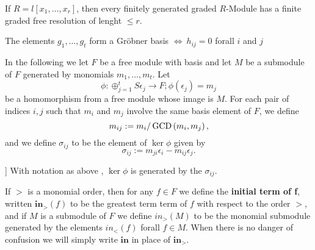 \documentclass{article}
\begin{document}






\begin{thm}
	If \( R = l \left[ x_{1}, \dots ,x_{r} \right] \), 
then every finitely generated graded \( R\)-Module has a finite graded free resolution of lenght \( \le r  \).
\end{thm}



\begin{thm}
	The elements \( g_1,\dots,g_t \) form a Gr\"obner basis \( \iff \ h_{ij}=0 \) forall \( i\) and \(j\)
\end{thm}


\begin{nota}[\nocite{Eis1}]
	In the following we let
	\( F \) 
	be a free module with basis and let 
	\( M \)
	be a submodule of 
	\( F \) generated by monomials
	\( m_{1},\dots,m_{t}\).
	Let
	\[
		\phi:\oplus_{j=1}^{t} S\epsilon_{j} \to F;
		\phi\left( \epsilon_{j} \right) = m_{j}
	\]
	be a homomorphism from a free module whose image is 
	\(M \).
	For each pair of indices 
	\(i,j\)
	such that 
	\( m_{i}\)
	and 
	\( m_{j}\)
	involve the same basis element of
	\( F \),
	we define 
	\[
		m_{ij} := m_{i}/\operatorname{GCD}\left( m_{i},m_{j} \right) ,
	\]
	and we define 
	\( \sigma_{ij} \)
	to be the element of 
	\( \ker \phi \) 
	given by
	\[
		\sigma_{ij} := m_{ji}\epsilon_{i}-m_{ij}\epsilon_{j} .
	\]
\end{nota}

\begin{lem}[\cite{Eis1}[15.1]\label{syzygy_generation}]
	With notation as above 
	,
	\( \ker \phi \)
	is generated by the 
	\( \sigma_{ij}\).
\end{lem}

\begin{defn}
	If \( > \) is a monomial order, 
	then for any \( f \in F \) we define the \textbf{initial term of f}, 
	written \( \textbf{in}_{>}\left( f \right) \) 
	to be the greatest term term of \( f \) 
	with respect to the order \( > \), 
	and if \( M \) is a submodule of \( F\) 
	we define \( in_{>}\left( M \right) \) 
	to be the monomial submodule generated by 
	the elements \( in_{<} \left( f \right) \) 
	forall \( f \in M \). 
	When there is no danger of confusion 
	we will simply write \( \textbf{in} \) in place of \( \textbf{in}_{>} \).
\end{defn}
\end{document}
